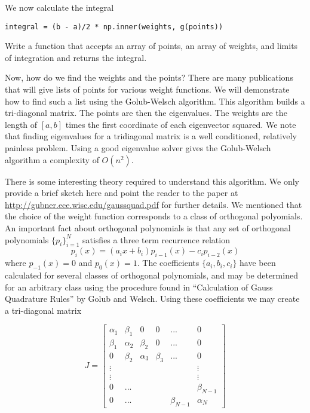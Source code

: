 We now calculate the integral

\begin{lstlisting}
integral = (b - a)/2 * np.inner(weights, g(points))
\end{lstlisting}

\begin{problem}

Write a function that accepts an array of points, an array of weights, and limits of integration and returns the integral.

\end{problem}

Now, how do we find the weights and the points?  There are many publications that will give lists of points for various weight functions.  We will demonstrate how to find such a list using the Golub-Welsch algorithm.  This algorithm builds a tri-diagonal matrix.  The points are then the eigenvalues. The weights are the length of $\left[a, b\right]$ times the first coordinate of each eigenvector squared.  We note that finding eigenvalues for a tridiagonal matrix is a well conditioned, relatively painless problem.  Using a good eigenvalue solver gives the Golub-Welsch algorithm a complexity of $O(n^2)$.

There is some interesting theory required to understand this algorithm.  We only provide a brief sketch here and point the reader to the paper at \url{http://gubner.ece.wisc.edu/gaussquad.pdf} for further details.  We mentioned that the choice of the weight function corresponds to a class of orthogonal polyomials.  An important fact about orthogonal polynomials is that any set of orthogonal polynomials $\{p_i\}_{i=1}^N$ satisfies a three term recurrence relation
\[
p_i(x) = (a_ix + b_i)p_{i-1}(x) - c_ip_{i-2}(x)
\]
where $p_{-1}(x) = 0$ and $p_0(x) = 1$.  The coefficients $\{a_i, b_i, c_i\}$ have been calculated for several classes of orthogonal polynomials, and may be determined for an arbitrary class using the procedure found in ``Calculation of Gauss Quadrature Rules'' by Golub and Welsch.  Using these coefficients we may create a tri-diagonal matrix

\[
J = \begin{bmatrix}

\alpha_1 & \beta_1 & 0 & 0 & ... & 0 \\
\beta_1 & \alpha_2 & \beta_2 & 0 & ... & 0 \\
0 & \beta_2 & \alpha_3 & \beta_3 & ... & 0 \\
\vdots & & & & & \vdots \\
\vdots & & & & & \vdots \\
0 & ... & & & & \beta_{N-1} \\
0 & ... & & & \beta_{N-1} & \alpha_N

\end{bmatrix}
\]

